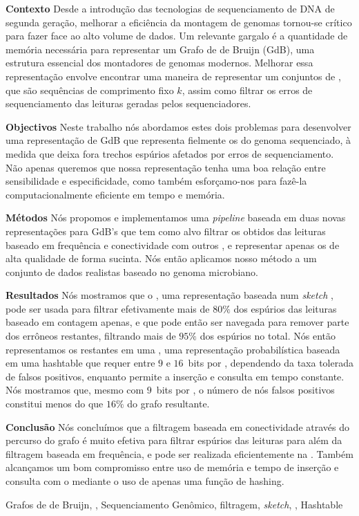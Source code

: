 \resumo

\textbf{Contexto} Desde a introdução das tecnologias de sequenciamento de DNA de segunda geração, melhorar a eficiência da montagem de genomas tornou-se crítico para fazer face ao alto volume de dados. Um relevante gargalo é a quantidade de memória necessária para representar um Grafo de de Bruijn (GdB), uma estrutura essencial dos montadores de genomas modernos. Melhorar essa representação envolve encontrar uma maneira de representar um conjuntos de \kmers, que são sequências de comprimento fixo $k$, assim como filtrar os erros de sequenciamento das leituras geradas pelos sequenciadores.

\noindent\textbf{Objectivos}  Neste trabalho nós abordamos estes dois problemas para desenvolver uma representação de GdB que representa fielmente os \kmers do genoma sequenciado, à medida que deixa fora trechos espúrios afetados por erros de sequenciamento. Não apenas queremos que nossa representação tenha uma boa relação entre sensibilidade e especificidade, como também esforçamo-nos para fazê-la computacionalmente eficiente em tempo e memória.

\noindent\textbf{Métodos} Nós propomos e implementamos uma \emph{pipeline} baseada em duas novas representações para GdB's que tem como alvo filtrar os  obtidos das leituras baseado em frequência e conectividade com outros , e representar apenas os  de alta qualidade de forma sucinta. Nós então aplicamos nosso método a um conjunto de dados realistas baseado no genoma microbiano.

\noindent\textbf{Resultados} Nós mostramos que o \dBCM, uma representação baseada num \emph{sketch} \cm, pode ser usada para filtrar efetivamente mais de $80\%$ dos  espúrios das leituras baseado em contagem apenas, e que pode então ser navegada para remover parte dos  errôneos restantes, filtrando mais de $95\%$ dos  espúrios no total. Nós então representamos os  restantes em uma \dBHT, uma representação probabilística baseada em uma hashtable que requer entre $9$ e $16$~bits por \kmer, dependendo da taxa tolerada de falsos positivos, enquanto permite a inserção e consulta em tempo constante. Nós mostramos que, mesmo com $9$~bits por \kmer, o número de nós falsos positivos constitui menos do que $16\%$ do grafo resultante.

\noindent\textbf{Conclusão} Nós concluímos que a filtragem baseada em conectividade através do percurso do grafo é muito efetiva para filtrar  espúrios das leituras para além da filtragem baseada em frequência, e pode ser realizada eficientemente na \dBCM. Também alcançamos um bom compromisso entre uso de memória e tempo de inserção e consulta com o \dBHT mediante o uso de apenas uma função de hashing.

\begin{keywords}
Grafos de de Bruijn, \kmer, Sequenciamento Genômico, filtragem, \emph{sketch}, \cm, Hashtable
\end{keywords}